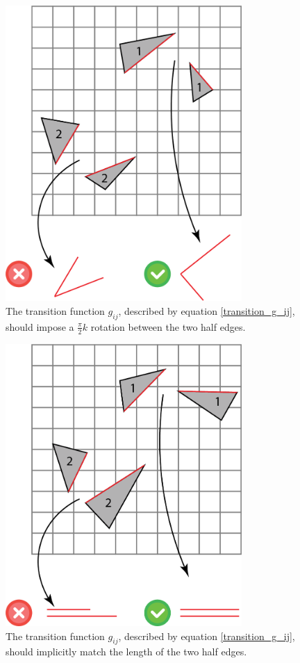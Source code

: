 \begin{figure}[ht]
\centering
\includegraphics[width=9cm]{figures/seamless/angle.png}
\caption[The Angle Requirement]{The transition function $g_{ij}$, described by equation \ref{transition_g_ij}, should impose a $\frac{\pi}{2}k$ rotation between the two half edges.}
\label{fig:angle_req}
\end{figure}
\begin{figure}[ht]
\centering
\includegraphics[width=9cm]{figures/seamless/length.png}
\caption[The Length Requirement]{The transition function $g_{ij}$, described by equation \ref{transition_g_ij}, should implicitly match the length of the two half edges.}
\label{fig:length_req}
\end{figure}
